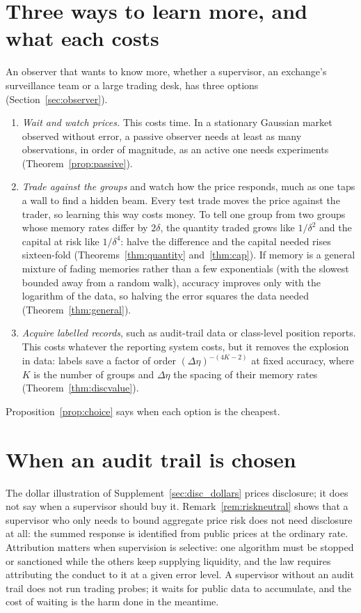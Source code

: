 \documentclass[12pt]{article}
\theoremstyle{definition}
\theoremstyle{remark}
\begin{document}
\section{Three ways to learn more, and what each costs}\label{app:threeways} An observer that wants to know more, whether a supervisor, an exchange's surveillance team or a large trading desk, has three options (Section~\ref{sec:observer}).
\begin{enumerate}[label=(\alph*),itemsep=1pt]
\item \emph{Wait and watch prices.} This costs time. In a stationary Gaussian market observed without error, a passive observer needs at least as many observations, in order of magnitude, as an active one needs experiments (Theorem~\ref{prop:passive}).
\item \emph{Trade against the groups} and watch how the price responds, much as one taps a wall to find a hidden beam. Every test trade moves the price against the trader, so learning this way costs money. To tell one group from two groups whose memory rates differ by $2\delta$, the quantity traded grows like $1/\delta^{2}$ and the capital at risk like $1/\delta^{4}$: halve the difference and the capital needed rises sixteen-fold (Theorems~\ref{thm:quantity} and~\ref{thm:cap}). If memory is a general mixture of fading memories rather than a few exponentials (with the slowest bounded away from a random walk), accuracy improves only with the logarithm of the data, so halving the error squares the data needed (Theorem~\ref{thm:general}).
\item \emph{Acquire labelled records}, such as audit-trail data or class-level position reports. This costs whatever the reporting system costs, but it removes the explosion in data: labels save a factor of order $(\Delta\eta)^{-(4K-2)}$ at fixed accuracy, where $K$ is the number of groups and $\Delta\eta$ the spacing of their memory rates (Theorem~\ref{thm:discvalue}).
\end{enumerate}
Proposition~\ref{prop:choice} says when each option is the cheapest.

\section{When an audit trail is chosen}\label{app:choice} The dollar illustration of Supplement~\ref{sec:disc_dollars} prices disclosure; it does not say when a supervisor should buy it. Remark~\ref{rem:riskneutral} shows that a supervisor who only needs to bound aggregate price risk does not need disclosure at all: the summed response is identified from public prices at the ordinary rate. Attribution matters when supervision is selective: one algorithm must be stopped or sanctioned while the others keep supplying liquidity, and the law requires attributing the conduct to it at a given error level. A supervisor without an audit trail does not run trading probes; it waits for public data to accumulate, and the cost of waiting is the harm done in the meantime.
\end{document}
